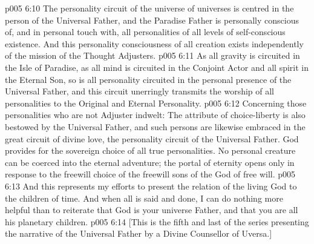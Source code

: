 \vs p005 6:10 \pc The personality circuit of the universe of universes is centred in the person of the Universal Father, and the Paradise Father is personally conscious of, and in personal touch with, all personalities of all levels of self\hyp{}conscious existence. And this personality consciousness of all creation exists independently of the mission of the Thought Adjusters.
\vs p005 6:11 \pc As all gravity is circuited in the Isle of Paradise, as all mind is circuited in the Conjoint Actor and all spirit in the Eternal Son, so is all personality circuited in the personal presence of the Universal Father, and this circuit unerringly transmits the worship of all personalities to the Original and Eternal Personality.
\vs p005 6:12 \pc Concerning those personalities who are not Adjuster indwelt: The attribute of choice\hyp{}liberty is also bestowed by the Universal Father, and such persons are likewise embraced in the great circuit of divine love, the personality circuit of the Universal Father. God provides for the sovereign choice of all true personalities. No personal creature can be coerced into the eternal adventure; the portal of eternity opens only in response to the freewill choice of the freewill sons of the God of free will.
\vs p005 6:13 \pc And this represents my efforts to present the relation of the living God to the children of time. And when all is said and done, I can do nothing more helpful than to reiterate that God is your universe Father, and that you are all his planetary children.
\vsetoff
\vs p005 6:14 [This is the fifth and last of the series presenting the narrative of the Universal Father by a Divine Counsellor of Uversa.]
\quizlink
